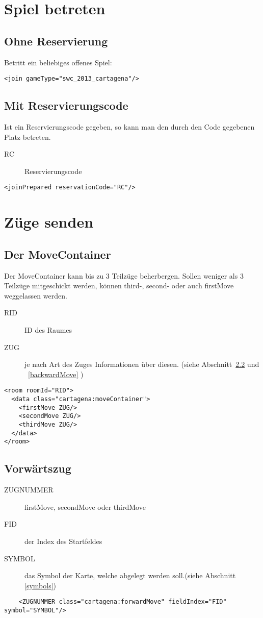 \documentclass[12pt,a4paper, ngerman, oneside]{scrartcl}
\begin{document}
\section{Spiel betreten}
\subsection{Ohne Reservierung}
Betritt ein beliebiges offenes Spiel:
\begin{verbatim}
<join gameType="swc_2013_cartagena"/>
\end{verbatim}
\subsection{Mit Reservierungscode}
Ist ein Reservierungscode gegeben, so kann man den durch den Code gegebenen Platz betreten.
\begin{description}
\item[RC] Reservierungscode
\end{description}
\begin{verbatim}
<joinPrepared reservationCode="RC"/>
\end{verbatim}

\section{Züge senden}

\subsection{\label{moveContainer}Der MoveContainer}
Der MoveContainer kann bis zu 3 Teilzüge beherbergen. Sollen weniger als 3
Teilzüge mitgeschickt werden, können third-, second- oder auch firstMove
weggelassen werden.
\begin{description}
\item[RID] ID des Raumes
\item[ZUG] je nach Art des Zuges Informationen über diesen. (siehe
Abschnitt~\ref{forwardMove} und ~\ref{backwardMove} )
\end{description}
\begin{verbatim}
<room roomId="RID">
  <data class="cartagena:moveContainer">
    <firstMove ZUG/>
    <secondMove ZUG/>
    <thirdMove ZUG/>
  </data>
</room>

\end{verbatim}
\subsection{Vorwärtszug}
\label{forwardMove}
\begin{description}
\item[ZUGNUMMER] firstMove, secondMove oder thirdMove
\item[FID] der Index des Startfeldes
\item[SYMBOL] das Symbol der Karte, welche abgelegt werden soll.(siehe
Abschnitt \ref{symbols})
\end{description}
\begin{verbatim}
	<ZUGNUMMER class="cartagena:forwardMove" fieldIndex="FID" symbol="SYMBOL"/>
\end{verbatim}
\end{document}
